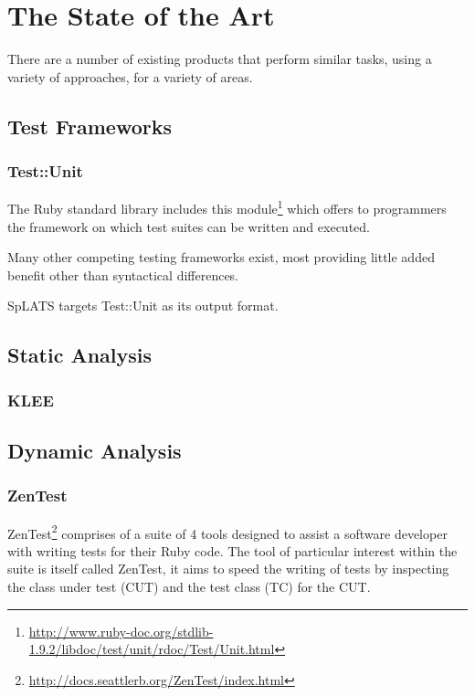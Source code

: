 \chapter{The State of the Art}

  There are a number of existing products that perform similar tasks, using a variety of approaches, for a variety of areas.

\section{Test Frameworks}

  \subsection{Test::Unit}
    The Ruby standard library includes this
module\footnote{\url{http://www.ruby-doc.org/stdlib-1.9.2/libdoc/test/unit/rdoc/Test/Unit.html}}
which offers to programmers the framework on which test suites can be written
and executed.

Many other competing testing frameworks exist, most providing little added
benefit other than syntactical differences.

SpLATS targets Test::Unit as its output format.

\section{Static Analysis}

  \subsection{KLEE}

\section{Dynamic Analysis} 

  \subsection{ZenTest}
    ZenTest\footnote{\url{http://docs.seattlerb.org/ZenTest/index.html}}
comprises of a suite of 4 tools designed to assist a software developer with
writing tests for their Ruby code. The tool of particular interest within the suite is itself called ZenTest,
it aims to speed the writing of tests by inspecting the class under test (CUT)
and the test class (TC) for the CUT.

